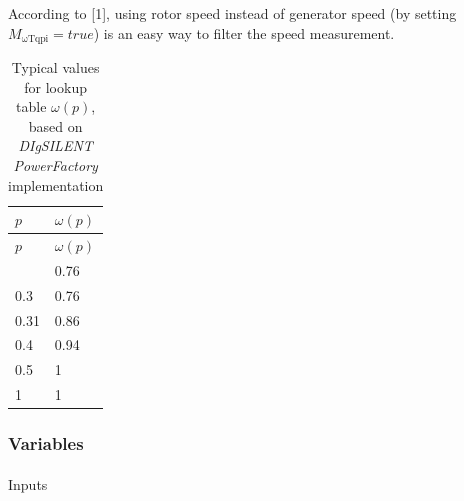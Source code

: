 \documentclass[
  a4paper,
  DIV=11,
  numbers=noendperiod]{scrartcl}
\makeatletter
\let\oldparagraph\paragraph
\renewcommand{\paragraph}{
    \@ifstar
      \xxxParagraphStar
      \xxxParagraphNoStar
  }
\newcommand{\xxxParagraphStar}[1]{\oldparagraph*{#1}\mbox{}}
\newcommand{\xxxParagraphNoStar}[1]{\oldparagraph{#1}\mbox{}}
\makeatother
\begin{document}
\begin{tcolorbox}[enhanced jigsaw, coltitle=black, bottomrule=.15mm, opacitybacktitle=0.6, rightrule=.15mm, colframe=quarto-callout-note-color-frame, titlerule=0mm, arc=.35mm, breakable, colbacktitle=quarto-callout-note-color!10!white, title=\textcolor{quarto-callout-note-color}{\faInfo}\hspace{0.5em}{Note}, colback=white, bottomtitle=1mm, toprule=.15mm, leftrule=.75mm, toptitle=1mm, left=2mm, opacityback=0]

According to {[}1{]}, using rotor speed instead of generator speed (by
setting \(M_\mathrm{\omega Tqpi} = true\)) is an easy way to filter the
speed measurement.

\end{tcolorbox}

\begin{longtable}[]{@{}ll@{}}
\caption{Typical values for lookup table \(\omega(p)\), based on
\emph{DIgSILENT PowerFactory}
implementation}\label{tbl-wtLookupTable}\tabularnewline
\toprule\noalign{}
\(p\) & \(\omega(p)\) \\
\midrule\noalign{}
\endfirsthead
\toprule\noalign{}
\(p\) & \(\omega(p)\) \\
\midrule\noalign{}
\endhead
\bottomrule\noalign{}
\endlastfoot
0 & 0.76 \\
0.3 & 0.76 \\
0.31 & 0.86 \\
0.4 & 0.94 \\
0.5 & 1 \\
1 & 1 \\
\end{longtable}

\subsubsection{Variables}\label{variables}

\paragraph{Inputs}\label{inputs}
\end{document}
